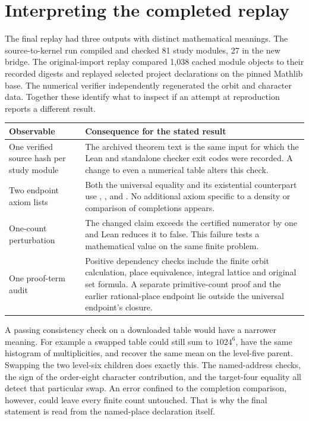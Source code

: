 \documentclass[12pt,letterpaper]{article}
\newcommand{\code}[1]{\texttt{\detokenize{#1}}}
\begin{document}
\section{Interpreting the completed replay}
The final replay had three outputs with distinct mathematical meanings. The source-to-kernel run compiled and checked 81 study modules, 27 in the new bridge. The original-import replay compared 1,038 cached module objects to their recorded digests and replayed selected project declarations on the pinned Mathlib base. The numerical verifier independently regenerated the orbit and character data. Together these identify what to inspect if an attempt at reproduction reports a different result.
\begin{center}\small
\begin{tabularx}{\linewidth}{@{}p{.22\linewidth}X@{}}\toprule
Observable & Consequence for the stated result\\\midrule
One verified source hash per study module & The archived theorem text is the same input for which the Lean and standalone checker exit codes were recorded. A change to even a numerical table alters this check.\\
Two endpoint axiom lists & Both the universal equality and its existential counterpart use \code{propext}, \code{Classical.choice}, and \code{Quot.sound}. No additional axiom specific to a density or comparison of completions appears.\\
One-count perturbation & The changed claim exceeds the certified numerator by one and Lean reduces it to false. This failure tests a mathematical value on the same finite problem.\\
One proof-term audit & Positive dependency checks include the finite orbit calculation, place equivalence, integral lattice and original set formula. A separate primitive-count proof and the earlier rational-place endpoint lie outside the universal endpoint's closure.\\\bottomrule
\end{tabularx}
\end{center}
A passing consistency check on a downloaded table would have a narrower meaning. For example a swapped table could still sum to $1024^6$, have the same histogram of multiplicities, and recover the same mean on the level-five parent. Swapping the two level-six children does exactly this. The named-address checks, the sign of the order-eight character contribution, and the target-four equality all detect that particular swap. An error confined to the completion comparison, however, could leave every finite count untouched. That is why the final statement is read from the named-place declaration itself.
\end{document}
